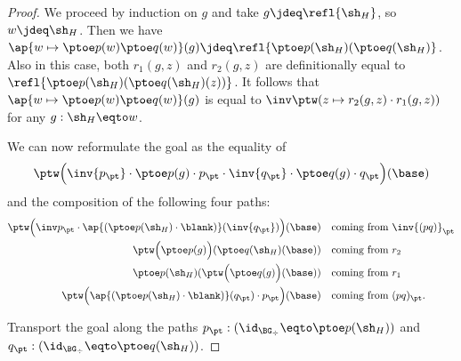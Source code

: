 \begin{proof}
We proceed by induction on $g$ and take
$g\jdeq\refl{\sh_H}$, so $w\jdeq\sh_H$. Then we have
$\ap{w\mapsto \ptoe p(w)\ptoe q(w)}(g) 
\jdeq \refl{\ptoe p(\sh_H)(\ptoe q(\sh_H)}$. Also in this case,
both $r_1(g,z)$ and $r_2(g,z)$ are definitionally equal to
$\refl{\ptoe p(\sh_H)(\ptoe q(\sh_H)(z))}$.
It follows that $\ap{w\mapsto \ptoe p(w)\ptoe q(w)}(g)$ is equal
to $\inv\ptw(z\mapsto r_2(g,z)\cdot r_1(g,z))$ for any $g:\sh_H\eqto w$. 

We can now reformulate the goal as %
the equality of 
\[
\ptw\Bigl(\inv{p_\pt} \cdot \ptoe p(g) \cdot p_\pt \cdot
\inv{q_\pt} \cdot \ptoe q(g) \cdot q_\pt\Bigr)(\base) 
\]
and the composition of the following four paths: 
\begin{align*}
\ptw\Bigl(\inv p_\pt \cdot \ap{(\ptoe p(\sh_H)\cdot\blank)}(\inv{q_\pt})\Bigr)(\base)
&\quad\text{coming from $\inv{(pq)}_\pt$} \\
\ptw\Bigl(\ptoe p(g)\Bigr)(\ptoe q(\sh_H)(\base))
&\quad\text{coming from $r_2$} \\
\ptoe p(\sh_H)(\ptw\Bigl(\ptoe q(g)\Bigr)(\base))
&\quad\text{coming from $r_1$} \\
\ptw\Bigl(\ap{(\ptoe p(\sh_H)\cdot\blank)}(q_\pt)\cdot p_\pt\Bigr)(\base) 
&\quad\text{coming from $(pq)_\pt$.}
\end{align*}

Transport the goal along the paths
$p_\pt: (\id_{\BG_\div}\eqto\ptoe p(\sh_H))$ and
$q_\pt: (\id_{\BG_\div}\eqto\ptoe q(\sh_H))$.


\end{proof}

